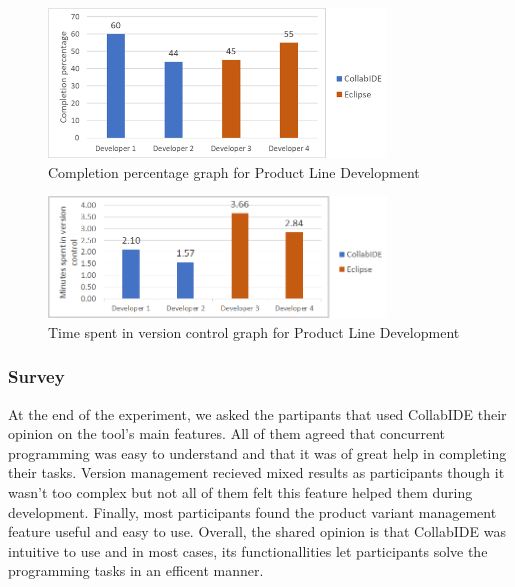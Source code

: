 \begin{figure}[htbp]
  \centering
  \includegraphics[width=0.8\textwidth]{img/completionProductLine}
  \caption{Completion percentage graph for Product Line Development}
  \label{fig:completionProductLine}
\end{figure}

\begin{figure}[htbp]
  \centering
  \includegraphics[width=0.8\textwidth]{img/versionControlProductLine}
  \caption{Time spent in version control graph for Product Line Development}
  \label{fig:versionControlProductLine}
\end{figure}

\subsubsection{Survey}
At the end of the experiment, we asked the partipants that used CollabIDE their opinion on the tool's main features. All of them agreed that concurrent programming was easy to understand and that it was of great help in completing their tasks. Version management recieved mixed results as participants though it wasn't too complex but not all of them felt this feature helped them during development. Finally, most participants found the product variant management feature useful and easy to use. Overall, the shared opinion is that CollabIDE was intuitive to use and in most cases, its functionallities let participants solve the programming tasks in an efficent manner. 

